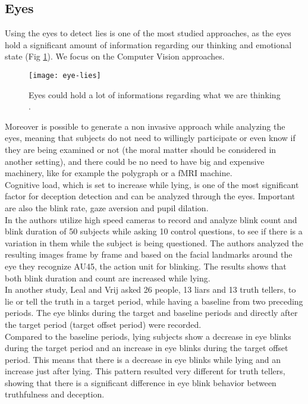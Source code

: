 \subsection*{Eyes}
Using the eyes to detect lies is one of the most studied approaches, as the eyes hold a significant amount of information regarding our thinking and emotional state \cite{FUKUDA2001239} (Fig \ref{fig:eye-lies}). We focus on the Computer Vision approaches.\\

\begin{figure}[H]
	\centering
	\texttt{[image: eye-lies]}
	\caption{Eyes could hold a lot of informations regarding what we are thinking \cite{eyeLies}.}
	\label{fig:eye-lies}
\end{figure}

Moreover is possible to generate a non invasive approach while analyzing the eyes, meaning that subjects do not need to willingly participate or even know if they are being examined or not (the moral matter should be considered in another setting), and there could be no need to have big and expensive machinery, like for example the polygraph or a fMRI machine. \\

Cognitive load, which is set to increase while lying, is one of the most significant factor for deception detection and can be analyzed through the eyes. Important are also the blink rate, gaze aversion and pupil dilation. \\

In \cite{8125844} the authors utilize high speed cameras to record and analyze blink count and blink duration of 50 subjects while asking 10 control questions, to see if there is a variation in them while the subject is being questioned. The authors analyzed the resulting images frame by frame and based on the facial landmarks around the eye they recognize AU45, the action unit for blinking. The results shows that both blink duration and count are increased while lying. \\

In another study, Leal and Vrij \cite{Leal2008} asked 26 people, 13 liars and 13 truth tellers, to lie or tell the truth in a target period, while having a baseline from two preceding periods. The eye blinks during the target and baseline periods and directly after the target period (target offset period) were recorded.\\
Compared to the baseline periods, lying subjects show a decrease in eye blinks during the target period and an increase in eye blinks during the target offset period. This means that there is a decrease in eye blinks while lying and an increase just after lying. This pattern resulted very different for truth tellers, showing that there is a significant difference in eye blink behavior between truthfulness and deception. \\

